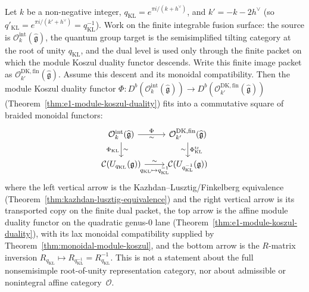 \begin{theorem}\label{thm:derived-dk-affine}
Let $k$ be a non-negative integer,
$q_{\mathrm{KL}} = e^{\pi i/(k + h^\vee)}$, and
$k' = -k - 2h^\vee$
\textup{(}so
$q'_{\mathrm{KL}} = e^{\pi i/(k' + h^\vee)}
=q_{\mathrm{KL}}^{-1}$\textup{)}.
Work on the finite integrable fusion surface: the source is
$\mathcal{O}_k^{\mathrm{int}}(\widehat{\mathfrak g})$, the quantum
group target is the semisimplified tilting category at the root of
unity $q_{\mathrm{KL}}$, and the dual level is used only through the
finite packet on which the module Koszul duality functor descends.
Write this finite image packet as
$\mathcal{O}_{k'}^{\mathrm{DK,fin}}(\widehat{\mathfrak g})$.
Assume this descent and its monoidal compatibility. Then
the module Koszul duality functor
$\Phi \colon D^b(\mathcal{O}_k^{\mathrm{int}}(\widehat{\mathfrak{g}}))
\to D^b(\mathcal{O}_{k'}^{\mathrm{DK,fin}}(\widehat{\mathfrak{g}}))$
\textup{(}Theorem~\textup{\ref{thm:e1-module-koszul-duality})}
fits into a commutative square of braided monoidal functors:
\begin{equation}\label{eq:dk-square-affine}
\begin{tikzcd}
\mathcal{O}_k^{\mathrm{int}}(\widehat{\mathfrak{g}})
 \ar[r, "\Phi", "\sim"']
 \ar[d, "\Phi_{\mathrm{KL}}"', "\sim"]
& \mathcal{O}_{k'}^{\mathrm{DK,fin}}(\widehat{\mathfrak{g}})
 \ar[d, "\Phi_{\mathrm{KL}}^{\mathrm{tr}}", "\sim"']
\\
\mathcal{C}(U_{q_{\mathrm{KL}}}(\mathfrak{g}))
 \ar[r, "q_{\mathrm{KL}} \mapsto q_{\mathrm{KL}}^{-1}"', "\sim"]
& \mathcal{C}(U_{q_{\mathrm{KL}}^{-1}}(\mathfrak{g}))
\end{tikzcd}
\end{equation}
where the left vertical arrow is the Kazhdan--Lusztig/Finkelberg
equivalence
\textup{(}Theorem~\textup{\ref{thm:kazhdan-lusztig-equivalence})}
and the right vertical arrow is its transported copy on the finite
dual packet,
the top arrow is the affine module duality functor on the quadratic
genus-$0$ lane \textup{(}Theorem~\textup{\ref{thm:e1-module-koszul-duality})},
with its lax monoidal compatibility supplied by
Theorem~\textup{\ref{thm:monoidal-module-koszul}}, and
the bottom arrow is the $R$-matrix inversion
$R_{q_{\mathrm{KL}}} \mapsto
R_{q_{\mathrm{KL}}^{-1}}=R_{q_{\mathrm{KL}}}^{-1}$.
This is not a statement about the full nonsemisimple
root-of-unity representation category, nor about admissible or
nonintegral affine category~$\mathcal O$.
\end{theorem}

